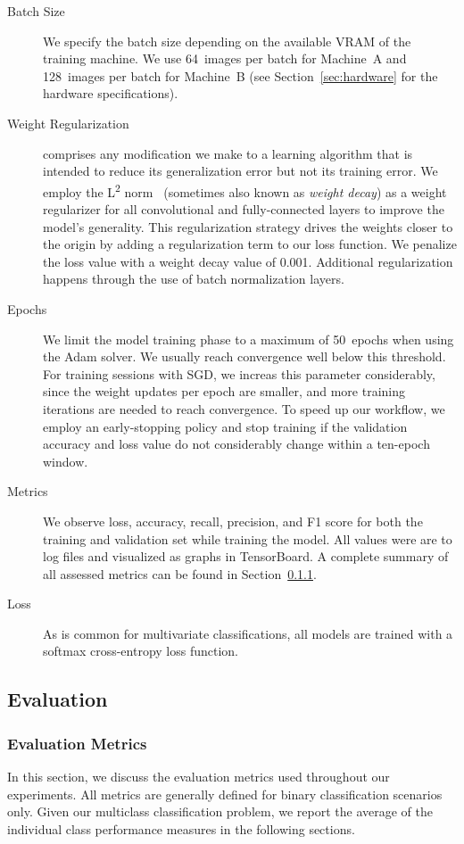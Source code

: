 \begin{description}
	\item[Batch Size] We specify the batch size depending on the available VRAM of the training machine. We use \num{64}~images per batch for Machine~A and \num{128}~images per batch for Machine~B (see Section~\ref{sec:hardware} for the hardware specifications).
	\item[Weight Regularization] comprises any modification we make to a learning algorithm that is intended to reduce its generalization error but not its training error. We employ the L\textsuperscript{2} norm~\cite[p.~231]{Goodfellow-et-al-2016} (sometimes also known as \emph{weight decay}) as a weight regularizer for all convolutional and fully-connected layers to improve the model's generality. This regularization strategy drives the weights closer to the origin by adding a regularization term to our loss function. We penalize the loss value with a weight decay value of \num{0.001}. Additional regularization happens through the use of batch normalization layers.
	\item[Epochs] We limit the model training phase to a maximum of \num{50}~epochs when using the Adam solver. We usually reach convergence well below this threshold. For training sessions with SGD, we increas this parameter considerably, since the weight updates per epoch are smaller, and more training iterations are needed to reach convergence. To speed up our workflow, we employ an early-stopping policy and stop training if the validation accuracy and loss value do not considerably change within a ten-epoch window.
	\item[Metrics] We observe loss, accuracy, recall, precision, and F1 score for both the training and validation set while training the model. All values were are to log files and visualized as graphs in TensorBoard. A complete summary of all assessed metrics can be found in Section~\ref{sec:metrics}.
	\item[Loss] As is common for multivariate classifications, all models are trained with a softmax cross-entropy loss function.
	\end{description}


\subsection{Evaluation}

\subsubsection{Evaluation Metrics}
\label{sec:metrics}
In this section, we discuss the evaluation metrics used throughout our experiments. All metrics are generally defined for binary classification scenarios only. Given our multiclass classification problem, we report the average of the individual class performance measures in the following sections.

